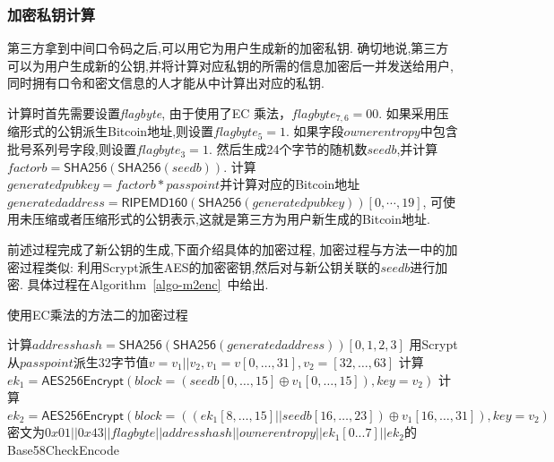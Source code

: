 \subsubsection{加密私钥计算}
第三方拿到中间口令码之后,可以用它为用户生成新的加密私钥.
确切地说,第三方可以为用户生成新的公钥,并将计算对应私钥的所需的信息加密后一并发送给用户,
同时拥有口令和密文信息的人才能从中计算出对应的私钥.  

计算时首先需要设置\textit{flagbyte}, 由于使用了EC
乘法，$flagbyte_{7,6}=00$. 如果采用压缩形式的公钥派生Bitcoin地址,则设置$flagbyte_5=1$.
如果字段$ownerentropy$中包含批号系列号字段,则设置$flagbyte_3=1$.
然后生成24个字节的随机数$seedb$,并计算$factorb=\textsf{SHA256}(\textsf{SHA256}(seedb))$.
计算$generatedpubkey = factorb * passpoint$并计算对应的Bitcoin地址
$generatedaddress=\textsf{RIPEMD160}(\textsf{SHA256}(generatedpubkey))[0,\cdots,19]$,
可使用未压缩或者压缩形式的公钥表示,这就是第三方为用户新生成的Bitcoin地址.



前述过程完成了新公钥的生成,下面介绍具体的加密过程,
加密过程与方法一中的加密过程类似:
利用Scrypt派生AES的加密密钥,然后对与新公钥关联的$seedb$进行加密.
具体过程在Algorithm~\ref{algo-m2enc}~中给出.

\begin{algorithm}[h]\footnotesize
\caption{使用EC乘法的方法二的加密过程}\label{algo-m2enc}
  	\begin{algorithmic}[1]
	   	\STATE 计算$addresshash=\textsf{SHA256}(\textsf{SHA256}(generatedaddress))[0,1,2,3]$ 
	    	\STATE 用Scrypt从$passpoint$派生32字节值$v=v_1||v_2, v_1 = v[0,\dots, 31], v_2= [32,\dots,63]$
	    	\STATE 计算$ek_1 = \textsf{AES256Encrypt}(block = (seedb[0,\dots,15] \oplus v_1[0,\dots,15]), key = v_2)$
		\STATE 计算$ek_2 = \textsf{AES256Encrypt}(block = ((ek_1[8,\dots,15] || seedb[16,\dots,23])  \oplus v_1[16,\dots,31]), key = v_2)$
		\STATE 密文为$0x01 || 0x43 || flagbyte || addresshash || ownerentropy ||  ek_1[0...7] || ek_2$的 \textsf{Base58CheckEncode}
    \end{algorithmic}
\end{algorithm}

